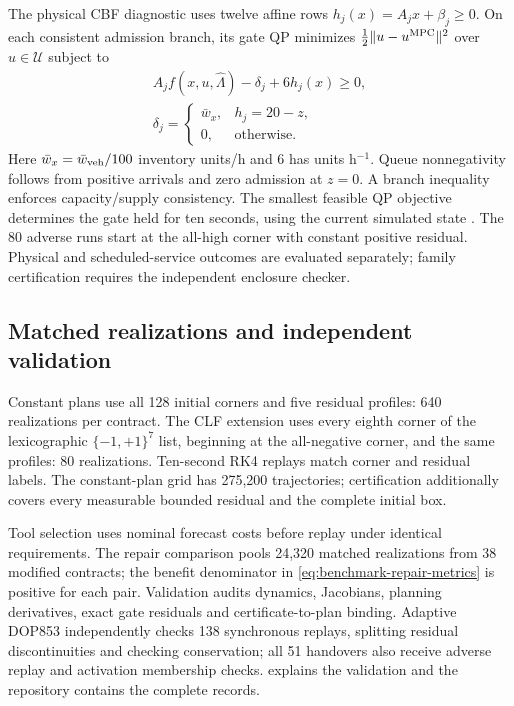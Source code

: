 The physical CBF diagnostic uses twelve affine rows
$h_j(x)=A_jx+\beta_j\ge0$. On each consistent admission branch, its gate QP
minimizes $\frac12\|u-u^{\rm MPC}\|^2$ over $u\in\mathcal U$ subject to
\begin{equation}
\begin{gathered}
A_jf(x,u,\widehat\Lambda)-\delta_j+6h_j(x)\ge0,\\
\delta_j=\begin{cases}\bar w_x,&h_j=20-z,\\0,&\text{otherwise}.
\end{cases}
\end{gathered}
\label{eq:benchmark-cbf}
\end{equation}
Here $\bar w_x=\bar w_{\rm veh}/100$ inventory units/h and $6$ has units
h$^{-1}$. Queue nonnegativity follows from positive arrivals and zero
admission at $z=0$. A branch inequality enforces capacity/supply consistency.
The smallest feasible QP objective determines the gate held for ten
seconds, using the current simulated state \cite{ames2017}. The 80 adverse
runs start at the all-high corner with constant positive residual. Physical
and scheduled-service outcomes are evaluated separately; family
certification requires the independent enclosure checker.

\subsection{Matched realizations and independent validation}
Constant plans use all 128 initial corners and five residual profiles:
640 realizations per contract. The CLF extension uses every eighth corner
of the lexicographic $\{-1,+1\}^7$ list, beginning at the all-negative
corner, and the same profiles: 80 realizations. Ten-second RK4 replays
match corner and residual labels. The constant-plan grid has 275,200
trajectories; certification additionally covers every measurable bounded
residual and the complete initial box.

Tool selection uses nominal forecast costs before replay under identical
requirements. The repair comparison pools 24,320 matched realizations from
38 modified contracts; the benefit denominator in
\eqref{eq:benchmark-repair-metrics} is positive for each pair. Validation
audits dynamics, Jacobians, planning derivatives, exact gate residuals and
certificate-to-plan binding. Adaptive DOP853 independently checks
138 synchronous replays, splitting residual discontinuities and checking
conservation; all 51 handovers also receive adverse replay and activation
membership checks.  explains the validation
and the repository contains the complete records.

